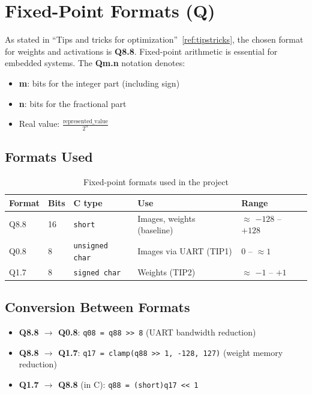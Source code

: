 \documentclass[11pt,a4paper]{article}
\begin{document}
\section{Fixed-Point Formats (Q)}

As stated in ``Tips and tricks for optimization''~\ref{ref:tipstricks}, the chosen format for weights and activations is \textbf{Q8.8}. Fixed-point arithmetic is essential for embedded systems. The \textbf{Qm.n} notation denotes:
\begin{itemize}
    \item \textbf{m}: bits for the integer part (including sign)
    \item \textbf{n}: bits for the fractional part
    \item Real value: $\frac{\text{represented\_value}}{2^n}$
\end{itemize}

\subsection{Formats Used}

\begin{table}[H]
\centering
\begin{tabular}{@{}lllll@{}}
\toprule
\textbf{Format} & \textbf{Bits} & \textbf{C type} & \textbf{Use} & \textbf{Range} \\
\midrule
Q8.8 & 16 & \texttt{short} & Images, weights (baseline) & $\approx$ $-128$ -- $+128$ \\
Q0.8 & 8 & \texttt{unsigned char} & Images via UART (TIP1) & $0$ -- $\approx 1$ \\
Q1.7 & 8 & \texttt{signed char} & Weights (TIP2) & $\approx$ $-1$ -- $+1$ \\
\bottomrule
\end{tabular}
\caption{Fixed-point formats used in the project}
\end{table}

\subsection{Conversion Between Formats}

\begin{itemize}
    \item \textbf{Q8.8 $\rightarrow$ Q0.8}: \texttt{q08 = q88 >> 8} (UART bandwidth reduction)
    \item \textbf{Q8.8 $\rightarrow$ Q1.7}: \texttt{q17 = clamp(q88 >> 1, -128, 127)} (weight memory reduction)
    \item \textbf{Q1.7 $\rightarrow$ Q8.8} (in C): \texttt{q88 = (short)q17 << 1}
\end{itemize}
\end{document}
